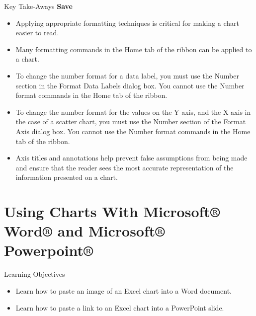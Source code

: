 \begin{center}
	\begin{tkwbox}{Key Take-Aways}
		\textbf{Save}
		\\
		\begin{itemize}
			\setlength{\itemsep}{0pt}
			\setlength{\parskip}{0pt}
			\setlength{\parsep}{0pt}

			\item Applying appropriate formatting techniques is critical for making a chart easier to read.
			\item Many formatting commands in the Home tab of the ribbon can be applied to a chart.
			\item To change the number format for a data label, you must use the Number section in the Format Data Labels dialog box. You cannot use the Number format commands in the Home tab of the ribbon.
			\item To change the number format for the values on the Y axis, and the X axis in the case of a scatter chart, you must use the Number section of the Format Axis dialog box. You cannot use the Number format commands
			in the Home tab of the ribbon.
			\item Axis titles and annotations help prevent false assumptions from being made and ensure that the reader sees the most accurate representation of the information presented on a chart.
			
		\end{itemize}
	\end{tkwbox}
\end{center}


\section{Using Charts With Microsoft® Word® and Microsoft® Powerpoint®}


\begin{center}
	\begin{objbox}{Learning Objectives}
		\begin{itemize}
			\setlength{\itemsep}{0pt}
			\setlength{\parskip}{0pt}
			\setlength{\parsep}{0pt}

			\item Learn how to paste an image of an Excel chart into a Word document.
			\item Learn how to paste a link to an Excel chart into a PowerPoint slide.
			
		\end{itemize}
	\end{objbox}
\end{center}

